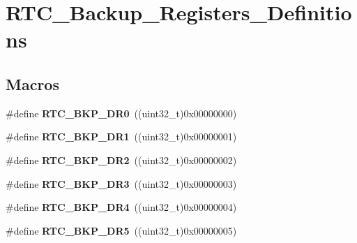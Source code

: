 \hypertarget{group___r_t_c___backup___registers___definitions}{}\section{R\+T\+C\+\_\+\+Backup\+\_\+\+Registers\+\_\+\+Definitions}
\label{group___r_t_c___backup___registers___definitions}
\subsection*{Macros}
\begin{DoxyCompactItemize}
\item 
\hypertarget{group___r_t_c___backup___registers___definitions_ga519bec4c7714e123cf2664f7394dc1ab}{}\#define {\bfseries R\+T\+C\+\_\+\+B\+K\+P\+\_\+\+D\+R0}~((uint32\+\_\+t)0x00000000)\label{group___r_t_c___backup___registers___definitions_ga519bec4c7714e123cf2664f7394dc1ab}

\item 
\hypertarget{group___r_t_c___backup___registers___definitions_ga6988b61b031e1407787095b0ff214ea8}{}\#define {\bfseries R\+T\+C\+\_\+\+B\+K\+P\+\_\+\+D\+R1}~((uint32\+\_\+t)0x00000001)\label{group___r_t_c___backup___registers___definitions_ga6988b61b031e1407787095b0ff214ea8}

\item 
\hypertarget{group___r_t_c___backup___registers___definitions_ga09963fdfb90ed5b7e32db13671447abb}{}\#define {\bfseries R\+T\+C\+\_\+\+B\+K\+P\+\_\+\+D\+R2}~((uint32\+\_\+t)0x00000002)\label{group___r_t_c___backup___registers___definitions_ga09963fdfb90ed5b7e32db13671447abb}

\item 
\hypertarget{group___r_t_c___backup___registers___definitions_ga014a39228ba4783b62ac8f11929ecd6a}{}\#define {\bfseries R\+T\+C\+\_\+\+B\+K\+P\+\_\+\+D\+R3}~((uint32\+\_\+t)0x00000003)\label{group___r_t_c___backup___registers___definitions_ga014a39228ba4783b62ac8f11929ecd6a}

\item 
\hypertarget{group___r_t_c___backup___registers___definitions_ga97545ebe0827a8650f953c371368f3f5}{}\#define {\bfseries R\+T\+C\+\_\+\+B\+K\+P\+\_\+\+D\+R4}~((uint32\+\_\+t)0x00000004)\label{group___r_t_c___backup___registers___definitions_ga97545ebe0827a8650f953c371368f3f5}

\item 
\hypertarget{group___r_t_c___backup___registers___definitions_gacab50ce68839698c48b8e2e143656ae7}{}\#define {\bfseries R\+T\+C\+\_\+\+B\+K\+P\+\_\+\+D\+R5}~((uint32\+\_\+t)0x00000005)\label{group___r_t_c___backup___registers___definitions_gacab50ce68839698c48b8e2e143656ae7}


\end{DoxyCompactItemize}
